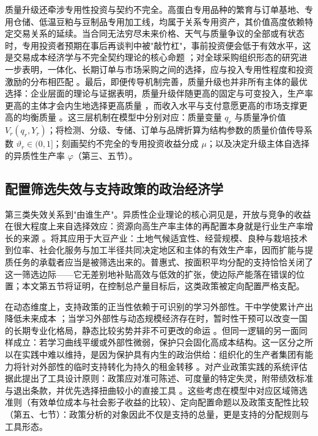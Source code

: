 \documentclass[UTF8,zihao=-4,fontset=fandol]{ctexart}
\numberwithin{equation}{section}
\theoremstyle{definition}
\theoremstyle{remark}
\begin{document}
质量升级还牵涉专用性投资与契约不完全。高蛋白专用品种的繁育与订单基地、专用仓储、低温豆粕与豆制品专用加工线，均属于关系专用资产，其价值高度依赖特定交易关系的延续。当合同无法穷尽未来价格、天气与质量争议的全部或有状态时，专用投资者预期在事后再谈判中被"敲竹杠"，事前投资便会低于有效水平，这是交易成本经济学与不完全契约理论的核心命题 \parencite{Williamson1979}；对全球采购组织形态的研究进一步表明，一体化、长期订单与市场采购之间的选择，应与投入专用性程度和投资激励的分布相匹配 \parencite{AntrasHelpman2004}。最后，即便传导机制完善，质量升级也并非所有主体的最优选择：企业层面的理论与证据表明，质量升级伴随更高的固定与可变投入，生产率更高的主体才会内生地选择更高质量 \parencite{Verhoogen2008,KuglerVerhoogen2012}，而收入水平与支付意愿更高的市场支撑更高的均衡质量 \parencite{FajgelbaumGrossmanHelpman2011}。这三层机制在模型中分别对应：质量变量 $q_r$ 与质量净价值 $V_r(q_r,Y_r)$；将检测、分级、专储、订单与品牌折算为结构参数的质量价值传导系数 $\vartheta_r\in(0,1]$；刻画契约不完全的专用投资收益分成 $\mu$；以及决定升级主体自选择的异质性生产率 $\varphi$（第三、五节）。

\subsection{配置筛选失效与支持政策的政治经济学}

第三类失效关系到"由谁生产"。异质性企业理论的核心洞见是，开放与竞争的收益在很大程度上来自选择效应：资源向高生产率主体的再配置本身就是行业生产率增长的来源 \parencite{Melitz2003}。将其应用于大豆产业：土地气候适宜性、经营规模、良种与栽培技术到位率、社会化服务与加工半径共同决定地区和主体的有效生产率，因而扩能与提质任务的承载者应当是被筛选出来的。普惠式、按面积平均分配的支持恰恰关闭了这一筛选边际——它无差别地补贴高效与低效的扩张，使边际产能落在错误的位置；本文第五节将证明，在控制总产量目标后，这类政策被定向配置严格支配。

在动态维度上，支持政策的正当性依赖于可识别的学习外部性。干中学使累计产出降低未来成本 \parencite{Arrow1962}；当学习外部性与动态规模经济存在时，暂时性干预可以改变一国的长期专业化格局，静态比较劣势并非不可更改的命运 \parencite{Krugman1987}。但同一逻辑的另一面同样成立：若学习曲线平缓或外部性微弱，保护只会固化高成本结构。这一区分之所以在实践中难以维持，是因为保护具有内生的政治供给：组织化的生产者集团有能力将针对外部性的临时支持转化为持久的租金转移 \parencite{GrossmanHelpman1994}。对产业政策实践的系统评估据此提出了工具设计原则：政策应对准可陈述、可度量的特定失灵，附带绩效标准与退出条款，并优先选择扭曲较小的直接工具 \parencite{JuhaszLaneRodrik2024}。这些考虑在模型中对应区域筛选准则（有效单位成本与社会影子收益的比较）、定向配置命题以及政策支配性比较（第五、七节）：政策分析的对象因此不仅是支持的总量，更是支持的分配规则与工具形态。
\end{document}
